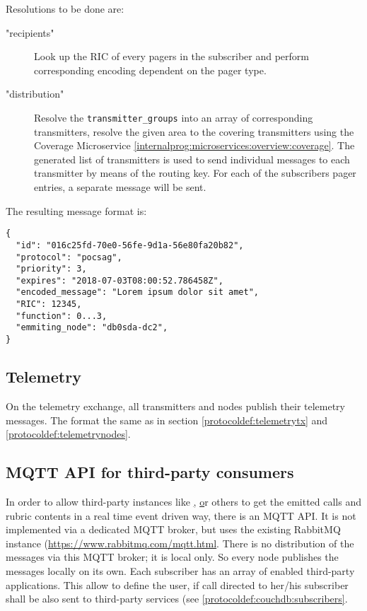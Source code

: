 Resolutions to be done are:
\begin{description}
\item["recipients"] Look up the RIC of every pagers in the subscriber and perform corresponding encoding dependent on the pager type.
\item["distribution"] Resolve the \texttt{transmitter\_groups} into an array of corresponding transmitters, resolve the given area to the covering transmitters using the Coverage Microservice \ref{internalprog:microservices:overview:coverage}. The generated list of transmitters is used to send individual messages to each transmitter by means of the routing key. For each of the subscribers pager entries, a separate message will be sent.
\end{description}

The resulting message format is:
\begin{lstlisting}
{
  "id": "016c25fd-70e0-56fe-9d1a-56e80fa20b82",
  "protocol": "pocsag",
  "priority": 3,
  "expires": "2018-07-03T08:00:52.786458Z",
  "encoded_message": "Lorem ipsum dolor sit amet",
  "RIC": 12345,
  "function": 0...3,
  "emmiting_node": "db0sda-dc2",
}
\end{lstlisting}


\subsection{Telemetry}
On the telemetry exchange, all transmitters and nodes publish their telemetry messages. The format the same as in section \ref{protocoldef:telemetrytx} and \ref{protocoldef:telemetrynodes}.

\subsection{MQTT API for third-party consumers}
\label{protocoldef:mqttapi}
In order to allow third-party instances like \href{http://www.aprs-is.net/|APRS}, \href{http://brandmeister.network|Brandmeister} or others to get the emitted calls and rubric contents in a real time event driven way, there is an MQTT API. It is not implemented via a dedicated MQTT broker, but uses the existing RabbitMQ instance (\url{https://www.rabbitmq.com/mqtt.html}. There is no distribution of the messages via this MQTT broker; it is local only. So every node publishes the messages locally on its own.
Each subscriber has an array of enabled third-party applications. This allow to define the user, if call directed to her/his subscriber shall be also sent to third-party services (see \ref{protocoldef:couchdb:subscribers}.

